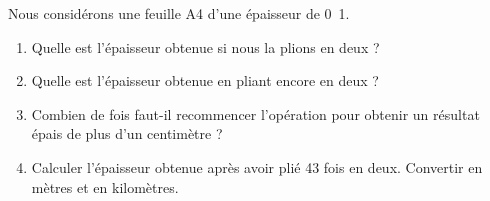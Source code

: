 
\begin{exercice}\label{exosmath-0308}

    Nous considérons une feuille A4 d'une épaisseur de \unit{0.1}{\milli\meter}. 
    \begin{enumerate}
        \item
            Quelle est l'épaisseur obtenue si nous la plions en deux ?
        \item 
            Quelle est l'épaisseur obtenue en pliant encore en deux ?
        \item
            Combien de fois faut-il recommencer l'opération pour obtenir un résultat épais de plus d'un centimètre ?
        \item
            Calculer l'épaisseur obtenue après avoir plié 43 fois en deux. Convertir en mètres et en kilomètres.
    \end{enumerate}

\end{exercice}
